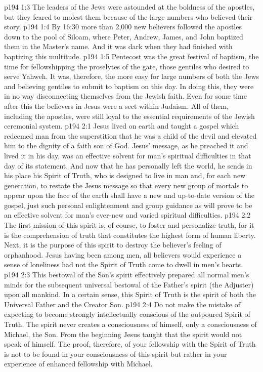 \vs p194 1:3 The leaders of the Jews were astounded at the boldness of the apostles, but they feared to molest them because of the large numbers who believed their story.
\vs p194 1:4 By 16:30 more than 2,000 new believers followed the apostles down to the pool of Siloam, where Peter, Andrew, James, and John baptized them in the Master’s name. And it was dark when they had finished with baptizing this multitude.
\vs p194 1:5 Pentecost was the great festival of baptism, the time for fellowshipping the proselytes of the gate, those gentiles who desired to serve Yahweh. It was, therefore, the more easy for large numbers of both the Jews and believing gentiles to submit to baptism on this day. In doing this, they were in no way disconnecting themselves from the Jewish faith. Even for some time after this the believers in Jesus were a sect within Judaism. All of them, including the apostles, were still loyal to the essential requirements of the Jewish ceremonial system.
\vs p194 2:1 Jesus lived on earth and taught a gospel which redeemed man from the superstition that he was a child of the devil and elevated him to the dignity of a faith son of God. Jesus’ message, as he preached it and lived it in his day, was an effective solvent for man’s spiritual difficulties in that day of its statement. And now that he has personally left the world, he sends in his place his Spirit of Truth, who is designed to live in man and, for each new generation, to restate the Jesus message so that every new group of mortals to appear upon the face of the earth shall have a new and up\hyp{}to\hyp{}date version of the gospel, just such personal enlightenment and group guidance as will prove to be an effective solvent for man’s ever\hyp{}new and varied spiritual difficulties.
\vs p194 2:2 \pc The first mission of this spirit is, of course, to foster and personalize truth, for it is the comprehension of truth that constitutes the highest form of human liberty. Next, it is the purpose of this spirit to destroy the believer’s feeling of orphanhood. Jesus having been among men, all believers would experience a sense of loneliness had not the Spirit of Truth come to dwell in men’s hearts.
\vs p194 2:3 This bestowal of the Son’s spirit effectively prepared all normal men’s minds for the subsequent universal bestowal of the Father’s spirit (the Adjuster) upon all mankind. In a certain sense, this Spirit of Truth is the spirit of both the Universal Father and the Creator Son.
\vs p194 2:4 Do not make the mistake of expecting to become strongly intellectually conscious of the outpoured Spirit of Truth. The spirit never creates a consciousness of himself, only a consciousness of Michael, the Son. From the beginning Jesus taught that the spirit would not speak of himself. The proof, therefore, of your fellowship with the Spirit of Truth is not to be found in your consciousness of this spirit but rather in your experience of enhanced fellowship with Michael.
